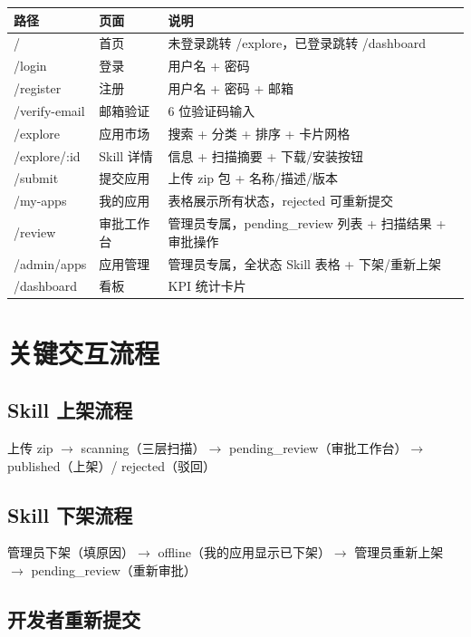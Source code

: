 \documentclass[11pt,a4paper]{article}
\begin{document}
\begin{table}[h]
\centering
\begin{tabularx}{\linewidth}{llX}
\toprule
\textbf{路径} & \textbf{页面} & \textbf{说明} \\
\midrule
/ & 首页 & 未登录跳转 /explore，已登录跳转 /dashboard \\
/login & 登录 & 用户名 + 密码 \\
/register & 注册 & 用户名 + 密码 + 邮箱 \\
/verify-email & 邮箱验证 & 6 位验证码输入 \\
/explore & 应用市场 & 搜索 + 分类 + 排序 + 卡片网格 \\
/explore/:id & Skill 详情 & 信息 + 扫描摘要 + 下载/安装按钮 \\
/submit & 提交应用 & 上传 zip 包 + 名称/描述/版本 \\
/my-apps & 我的应用 & 表格展示所有状态，rejected 可重新提交 \\
/review & 审批工作台 & 管理员专属，pending\_review 列表 + 扫描结果 + 审批操作 \\
/admin/apps & 应用管理 & 管理员专属，全状态 Skill 表格 + 下架/重新上架 \\
/dashboard & 看板 & KPI 统计卡片 \\
\bottomrule
\end{tabularx}
\end{table}

\section{关键交互流程}

\subsection{Skill 上架流程}

上传 zip $\to$ scanning（三层扫描）$\to$ pending\_review（审批工作台）$\to$ published（上架）/ rejected（驳回）

\subsection{Skill 下架流程}

管理员下架（填原因）$\to$ offline（我的应用显示已下架）$\to$ 管理员重新上架 $\to$ pending\_review（重新审批）

\subsection{开发者重新提交}
\end{document}
